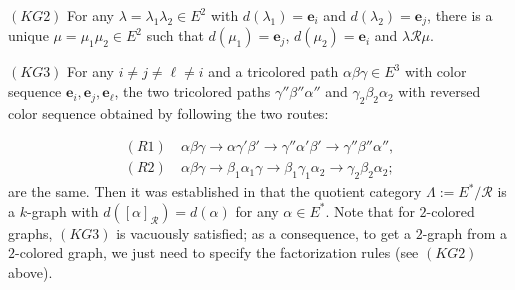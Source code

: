 \documentclass[a4paper,reqno,12pt]{amsart}
\theoremstyle{definition}
\theoremstyle{remark}
\begin{document}
$(KG2)$ For any $\lambda=\lambda_1\lambda_2\in E^2$ with $d(\lambda_1)=\mathbf{e}_i$ and $d(\lambda_2)=\mathbf{e}_j$, there is a unique $\mu=\mu_1\mu_2\in E^2$ such that $d(\mu_1)=\mathbf{e}_j$, $d(\mu_2)=\mathbf{e}_i$ and $\lambda\mathcal{R}\mu$. 

$(KG3)$ For any $i\neq j\neq \ell\neq i$ and a tricolored path $\alpha\beta\gamma\in E^3$ with color sequence $\mathbf{e}_i,\mathbf{e}_j,\mathbf{e}_\ell$, the two tricolored paths $\gamma''\beta''\alpha''$ and $\gamma_2\beta_2\alpha_2$ with reversed color sequence obtained by following the two routes: 

\begin{align*}
(R1)~ &\alpha\beta\gamma\longrightarrow \alpha \gamma'\beta'\longrightarrow \gamma''\alpha'\beta'\longrightarrow \gamma''\beta''\alpha'',\\
(R2)~ &\alpha\beta\gamma\longrightarrow \beta_1 \alpha_1 \gamma\longrightarrow \beta_1 \gamma_1 \alpha_2\longrightarrow \gamma_2 \beta_2 \alpha_2;
\end{align*}
are the same. Then it was established in \cite[Theorem 4.5]{HRSW} that the quotient category $\Lambda:=E^*/\mathcal{R}$ is a $k$-graph with $d([\alpha]_\mathcal{R})=d(\alpha)$ for any $\alpha\in E^*$. Note that for $2$-colored graphs, $(KG3)$ is vacuously satisfied; as a consequence, to get a $2$-graph from a $2$-colored graph, we just need to specify the factorization rules (see $(KG2)$ above). 
\end{document}
